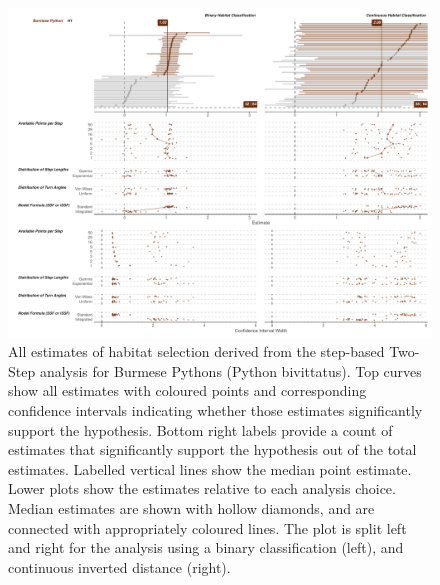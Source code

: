 \documentclass[10pt,a4paper]{article}
\begin{document}
\begin{figure}[h]
\includegraphics[width=1\linewidth]{../../figures/specCurve_Burmese Python_twoStep} \caption{All estimates of habitat selection derived from the step-based Two-Step analysis for Burmese Pythons (Python bivittatus). Top curves show all estimates with coloured points and corresponding confidence intervals indicating whether those estimates significantly support the hypothesis. Bottom right labels provide a count of estimates that significantly support the hypothesis out of the total estimates. Labelled vertical lines show the median point estimate. Lower plots show the estimates relative to each analysis choice. Median estimates are shown with hollow diamonds, and are connected with appropriately coloured lines. The plot is split left and right for the analysis using a binary classification (left), and continuous inverted distance (right).}\label{fig:specCurveTwoStepPYBI}
\end{figure}
\end{document}

